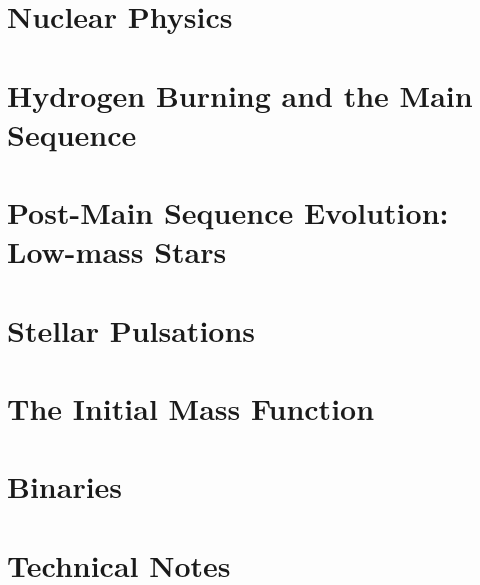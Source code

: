 \documentclass{astro-bookshelf}
\begin{document}
\chapter{Nuclear Physics}


\chapter[Main Sequence]{Hydrogen Burning and the Main Sequence}


\chapter[Low-Mass Post-Main Sequence]{Post-Main Sequence Evolution: Low-mass Stars}


\chapter{Stellar Pulsations}\label{s.pulsations}


\chapter{The Initial Mass Function}\label{ch.IMF}


\chapter{Binaries}\label{ch.binaries}


\appendix
\chapter{Technical Notes}\label{s.technical-notes}


\backmatter


\end{document}
